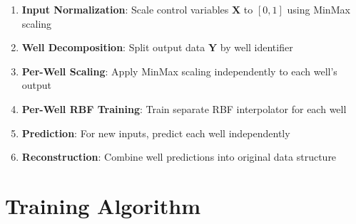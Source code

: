 \documentclass[11pt]{article}
\begin{document}
\begin{enumerate}
    \item \textbf{Input Normalization}: Scale control variables $\mathbf{X}$ to $[0,1]$ using MinMax scaling
    \item \textbf{Well Decomposition}: Split output data $\mathbf{Y}$ by well identifier
    \item \textbf{Per-Well Scaling}: Apply MinMax scaling independently to each well's output
    \item \textbf{Per-Well RBF Training}: Train separate RBF interpolator for each well
    \item \textbf{Prediction}: For new inputs, predict each well independently
    \item \textbf{Reconstruction}: Combine well predictions into original data structure
\end{enumerate}

\section{Training Algorithm}
\end{document}
